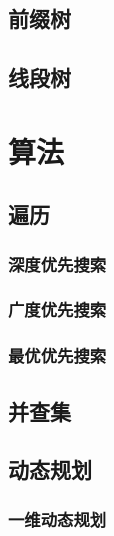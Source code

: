 \section{前缀树}
\section{线段树}

\chapter{算法}
\section{遍历}
\subsection{深度优先搜索}

\subsection{广度优先搜索}

\subsection{最优优先搜索}

\section{并查集}

\section{动态规划}

\subsection{一维动态规划}

